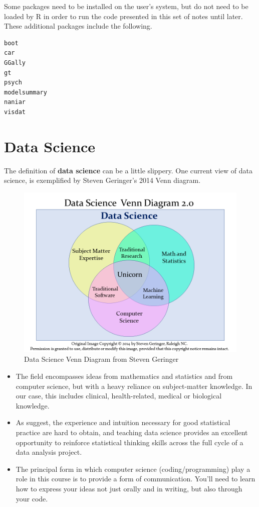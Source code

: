 \documentclass[
]{book}
\providecommand{\tightlist}{%
  \setlength{\itemsep}{0pt}\setlength{\parskip}{0pt}}
\begin{document}
Some packages need to be installed on the user's system, but do not need to be loaded by R in order to run the code presented in this set of notes until later. These additional packages include the following.

\begin{verbatim}
boot
car
GGally
gt
psych
modelsummary
naniar
visdat
\end{verbatim}

\hypertarget{data-science}{%
\chapter{Data Science}\label{data-science}}

The definition of \textbf{data science} can be a little slippery. One current view of data science, is exemplified by Steven Geringer's 2014 Venn diagram.

\begin{figure}
\includegraphics[width=0.8\linewidth]{figures/data-science-venn20} \caption{Data Science Venn Diagram from Steven Geringer}\label{fig:datasci-fig}
\end{figure}

\begin{itemize}
\tightlist
\item
  The field encompasses ideas from mathematics and statistics and from computer science, but with a heavy reliance on subject-matter knowledge. In our case, this includes clinical, health-related, medical or biological knowledge.
\item
  As \citet{Gelman-Nolan} suggest, the experience and intuition necessary for good statistical practice are hard to obtain, and teaching data science provides an excellent opportunity to reinforce statistical thinking skills across the full cycle of a data analysis project.
\item
  The principal form in which computer science (coding/programming) play a role in this course is to provide a form of communication. You'll need to learn how to express your ideas not just orally and in writing, but also through your code.
\end{itemize}
\end{document}
